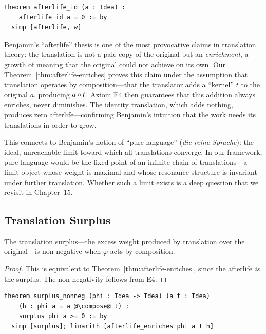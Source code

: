 \begin{lstlisting}
theorem afterlife_id (a : Idea) :
    afterlife id a = 0 := by
  simp [afterlife, w]
\end{lstlisting}

\begin{interpretation}
\label{int:benjamin-afterlife}
Benjamin's ``afterlife'' thesis is one of the most provocative claims in
translation theory: the translation is not a pale copy of the original
but an \emph{enrichment}, a growth of meaning that the original could not
achieve on its own.  Our Theorem~\ref{thm:afterlife-enriches} proves this
claim under the assumption that translation operates by composition---that
the translator adds a ``kernel'' $t$ to the original $a$, producing
$a \circ t$.  Axiom E4 then guarantees that this addition always
enriches, never diminishes.  The identity translation, which adds nothing,
produces zero afterlife---confirming Benjamin's intuition that the work
needs its translations in order to grow.

This connects to Benjamin's notion of ``pure language'' (\emph{die reine
Sprache}): the ideal, unreachable limit toward which all translations
converge.  In our framework, pure language would be the fixed point of
an infinite chain of translations---a limit object whose weight is
maximal and whose resonance structure is invariant under further
translation.  Whether such a limit exists is a deep question that we
revisit in Chapter~15.
\end{interpretation}

\subsection{Translation Surplus}

\begin{theorem}
\label{thm:surplus-nonneg}
The translation surplus---the excess weight produced by translation over
the original---is non-negative when $\varphi$ acts by composition.
\end{theorem}

\begin{proof}
This is equivalent to Theorem~\ref{thm:afterlife-enriches}, since the
afterlife \emph{is} the surplus.  The non-negativity follows from E4.
\end{proof}

\begin{lstlisting}
theorem surplus_nonneg (phi : Idea -> Idea) (a t : Idea)
    (h : phi a = a @\compose@ t) :
    surplus phi a >= 0 := by
  simp [surplus]; linarith [afterlife_enriches phi a t h]
\end{lstlisting}

